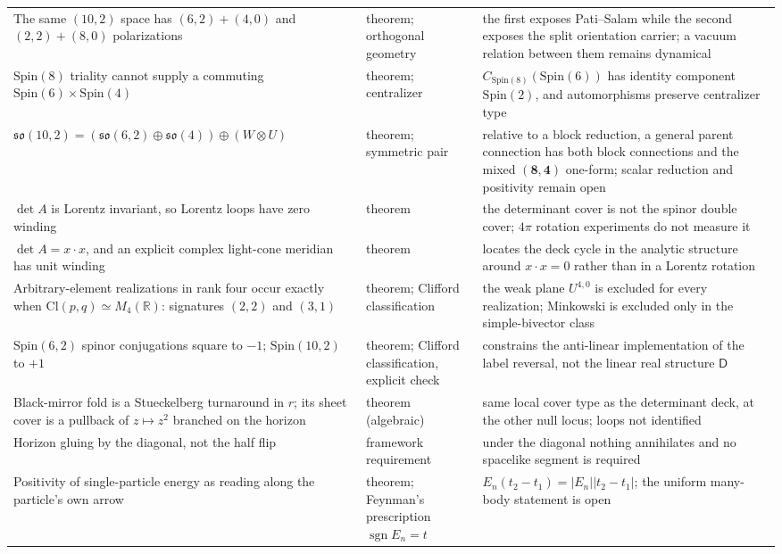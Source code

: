 \documentclass[11pt]{article}
\newcommand{\sgn}{\operatorname{sgn}}
\theoremstyle{definition}\newtheorem{definition}[theorem]{Definition}
\theoremstyle{remark}\newtheorem{remark}[theorem]{Remark}\newtheorem{conjecture}[theorem]{Conjecture}
\begin{document}
\begin{longtable}{>{\raggedright\arraybackslash}p{} >{\raggedright\arraybackslash}p{} >{\raggedright\arraybackslash}p{}}
The same $(10,2)$ space has $(6,2)+(4,0)$ and $(2,2)+(8,0)$ polarizations & theorem; orthogonal geometry & the first exposes Pati--Salam while the second exposes the split orientation carrier; a vacuum relation between them remains dynamical\\
$\mathrm{Spin}(8)$ triality cannot supply a commuting $\mathrm{Spin}(6)\times\mathrm{Spin}(4)$ & theorem; centralizer & $C_{\mathrm{Spin}(8)}(\mathrm{Spin}(6))$ has identity component $\mathrm{Spin}(2)$, and automorphisms preserve centralizer type\\
$\mathfrak{so}(10,2)=(\mathfrak{so}(6,2)\oplus\mathfrak{so}(4))\oplus(W\otimes U)$ & theorem; symmetric pair & relative to a block reduction, a general parent connection has both block connections and the mixed $(\mathbf8,\mathbf4)$ one-form; scalar reduction and positivity remain open\\
$\det A$ is Lorentz invariant, so Lorentz loops have zero winding & theorem & the determinant cover is not the spinor double cover; $4\pi$ rotation experiments do not measure it\\
$\det A=x\cdot x$, and an explicit complex light-cone meridian has unit winding & theorem & locates the deck cycle in the analytic structure around $x\cdot x=0$ rather than in a Lorentz rotation\\
Arbitrary-element realizations in rank four occur exactly when $\mathrm{Cl}(p,q)\simeq M_4(\mathbb R)$: signatures $(2,2)$ and $(3,1)$ & theorem; Clifford classification & the weak plane $U^{4,0}$ is excluded for every realization; Minkowski is excluded only in the simple-bivector class\\
$\mathrm{Spin}(6,2)$ spinor conjugations square to $-1$; $\mathrm{Spin}(10,2)$ to $+1$ & theorem; Clifford classification, explicit check & constrains the anti-linear implementation of the label reversal, not the linear real structure $\mathsf D$\\
Black-mirror fold is a Stueckelberg turnaround in $r$; its sheet cover is a pullback of $z\mapsto z^2$ branched on the horizon & theorem (algebraic) & same local cover type as the determinant deck, at the other null locus; loops not identified\\
Horizon gluing by the diagonal, not the half flip & framework requirement & under the diagonal nothing annihilates and no spacelike segment is required\\
Positivity of single-particle energy as reading along the particle's own arrow & theorem; Feynman's prescription $\sgn E_n=t$ & $E_n(t_2-t_1)=|E_n||t_2-t_1|$; the uniform many-body statement is open\\

\end{longtable}
\end{document}
